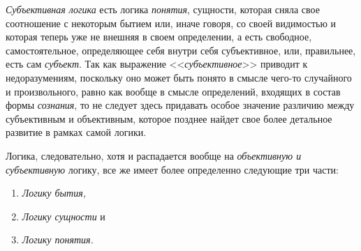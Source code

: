 {\em Субъективная логика} есть логика
{\em понятия}, сущности, которая сняла свое соотношение
с некоторым бытием или, иначе говоря, со своей видимостью и которая теперь
уже не внешняя в своем определении, а есть свободное, самостоятельное,
определяющее себя внутри себя субъективное, или, правильнее, есть сам
{\em субъект}. Так как выражение
<<{\em субъективное}>> приводит к недоразумениям,
поскольку оно может быть понято в смысле чего-то случайного и
произвольного, равно как вообще в смысле определений, входящих в состав
формы {\em сознания}, то не следует здесь придавать
особое значение различию между субъективным и объективным, которое позднее
найдет свое более детальное развитие в рамках самой логики.

Логика, следовательно, хотя и распадается вообще на
{\em объективную и субъективную} логику, все же имеет
более определенно следующие три части:
\begin{enumerate}[~~~~I.]
\item{\em Логику бытия,}
\item{\em Логику сущности} и
\item{\em Логику понятия.}
\end{enumerate}

\bigskip
